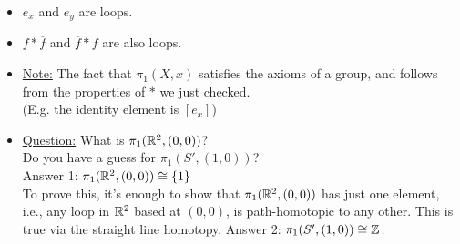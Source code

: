 \documentclass[../notes.tex]{subfiles}
\begin{document}
    \begin{itemize}
        \item $e_x$ and $e_y$ are loops.
        \item $f*\overline{f}$ and $\overline{f}*f$ are also loops.
        \item \underline{Note:} The fact that $\pi_1(X,x)$ satisfies the axioms of a group, and follows from the
            properties of $*$ we just checked.\\
            (E.g. the identity element is $[e_x]$)\\
        \item \underline{Question:} What is $\pi_1(\mathbb{R}^2, (0,0))$?\\
            Do you have a guess for $\pi_{1}(S', (1,0))$?\\
            Answer 1: $\pi_1(\mathbb{R}^2, (0,0))\cong \{1\}$\\
            To prove this, it's enough to show that $\pi_1(\mathbb{R}^2, (0,0))$ has just one element,\\
            i.e., any loop in $\mathbb{R}^2$ based at $(0,0)$, is path-homotopic to any other. This is true
            via the straight line homotopy.
            Answer 2: $\pi_1(S', (1,0))\cong \mathbb{Z}$.\\
    \end{itemize}
\end{document}
